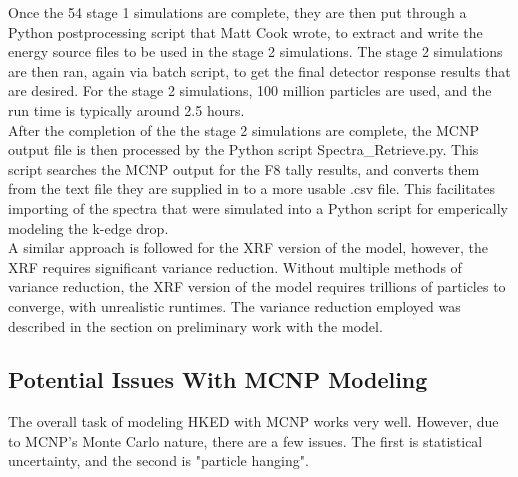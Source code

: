 Once the 54 stage 1 simulations are complete, they are then put through a Python postprocessing script that Matt Cook wrote, to extract and write the energy source files to be used in the stage 2 simulations. The stage 2 simulations are then ran, again via batch script, to get the final detector response results that are desired. For the stage 2 simulations, 100 million particles are used, and the run time is typically around 2.5 hours. \\

After the completion of the the stage 2 simulations are complete, the MCNP output file is then processed by the Python script Spectra\_Retrieve.py. This script searches the MCNP output for the F8 tally results, and converts them from the text file they are supplied in to a more usable .csv file. This facilitates importing of the spectra that were simulated into a Python script for emperically modeling the k-edge drop. \\

A similar approach is followed for the XRF version of the model, however, the XRF requires significant variance reduction. Without multiple methods of variance reduction, the XRF version of the model requires trillions of particles to converge, with unrealistic runtimes. The variance reduction employed was described in the section on preliminary work with the model. \\

\subsection{Potential Issues With MCNP Modeling}

The overall task of modeling HKED with MCNP works very well. However, due to MCNP's Monte Carlo nature, there are a few issues. The first is statistical uncertainty, and the second is "particle hanging". \\

